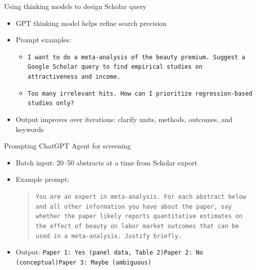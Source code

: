 \documentclass{beamer} %
\begin{document}
\begin{frame}{Using thinking models to design Scholar query}
\begin{itemize}
  \item GPT thinking model helps refine search precision
  \item Prompt examples:
	
  \begin{itemize}
    \item \texttt{I want to do a meta-analysis of the beauty premium. Suggest a Google Scholar query to find empirical studies on attractiveness and income.}
    \item \texttt{Too many irrelevant hits. How can I prioritize regression-based studies only?}
  \end{itemize}
	
  \item Output improves over iterations: clarify units, methods, outcomes, and keywords
\end{itemize}
\end{frame}

\begin{frame}{Prompting ChatGPT Agent for screening}
\begin{itemize}
  \item Batch input: 20--50 abstracts at a time from Scholar export
  \item Example prompt:
	
  \begin{quote}
    \texttt{You are an expert in meta-analysis. For each abstract below and all other information you have about the paper, say whether the paper likely reports quantitative estimates on the effect of beauty on labor market outcomes that can be used in a meta-analysis. Justify briefly.}
  \end{quote}
	
  \item Output: \texttt{\small Paper 1: Yes (panel data, Table 2)\quad Paper 2: No (conceptual)\quad Paper 3: Maybe (ambiguous)}
\end{itemize}
\end{frame}
\end{document}
